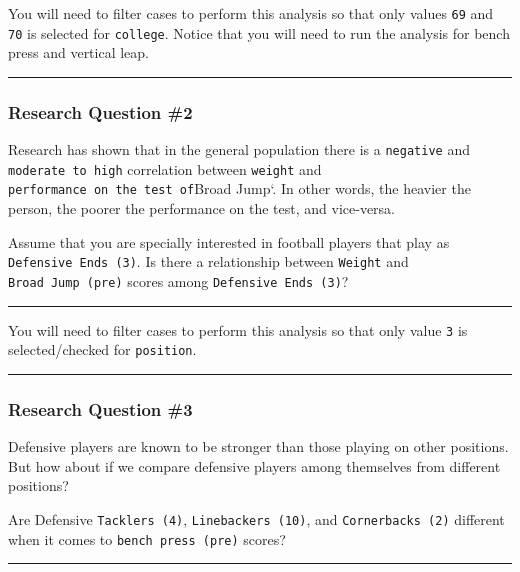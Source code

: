 \documentclass[
]{article}
\begin{document}
You will need to filter cases to perform this analysis so that only values \texttt{69} and \texttt{70} is selected for \texttt{college}. Notice that you will need to run the analysis for bench press and vertical leap.

\begin{center}\rule{0.5\linewidth}{0.5pt}\end{center}

\hypertarget{research-question-2}{%
\subsubsection{Research Question \#2}\label{research-question-2}}

Research has shown that in the general population there is a \texttt{negative} and \texttt{moderate\ to\ high} correlation between \texttt{weight} and \texttt{performance\ on\ the\ test\ of}Broad Jump`. In other words, the heavier the person, the poorer the performance on the test, and vice-versa.

Assume that you are specially interested in football players that play as \texttt{Defensive\ Ends\ (3)}. Is there a relationship between \texttt{Weight} and \texttt{Broad\ Jump\ (pre)} scores among \texttt{Defensive\ Ends\ (3)}?

\begin{center}\rule{0.5\linewidth}{0.5pt}\end{center}

You will need to filter cases to perform this analysis so that only value \texttt{3} is selected/checked for \texttt{position}.

\begin{center}\rule{0.5\linewidth}{0.5pt}\end{center}

\hypertarget{research-question-3}{%
\subsubsection{Research Question \#3}\label{research-question-3}}

Defensive players are known to be stronger than those playing on other positions. But how about if we compare defensive players among themselves from different positions?

Are Defensive \texttt{Tacklers\ (4)}, \texttt{Linebackers\ (10)}, and \texttt{Cornerbacks\ (2)} different when it comes to \texttt{bench\ press\ (pre)} scores?

\begin{center}\rule{0.5\linewidth}{0.5pt}\end{center}
\end{document}
